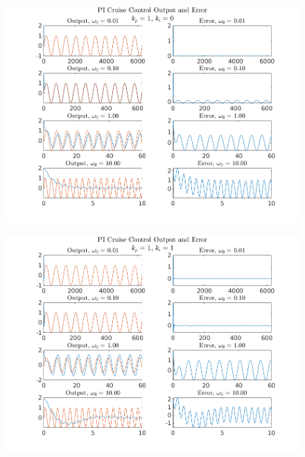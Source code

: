 \documentclass[11pt]{article}
\theoremstyle{definition}
\begin{document}
\begin{enumerate}
\begin{enumerate}
        \begin{figure}
            \centering
            \includegraphics{ES155P1_4ci_output.png}
            \caption{}
            \label{fig.output_i}
        \end{figure}
        
        \begin{figure}
            \centering
            \includegraphics{ES155P1_4cii_output.png}
            \caption{}
            \label{fig.output_ii}
        \end{figure}


\end{enumerate}
\end{enumerate}
\end{document}
